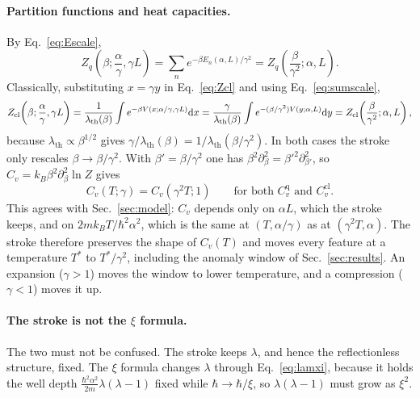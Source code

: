 \documentclass[11pt]{article}
\numberwithin{equation}{section}
\newcommand{\lth}{\lambda_{\mathrm{th}}}
\newcommand{\Cq}{C_v^{\mathrm{q}}}
\newcommand{\Ccl}{C_v^{\mathrm{cl}}}
\newcommand{\kB}{k_{B}}
\begin{document}
\paragraph{Partition functions and heat capacities.} By Eq.~\eqref{eq:Escale},
\[
Z_q\!\left(\beta;\frac\alpha\gamma,\gamma L\right)=\sum_ne^{-\beta E_n(\alpha,L)/\gamma^2}=Z_q\!\left(\frac{\beta}{\gamma^2};\alpha,L\right).
\]
Classically, substituting $x=\gamma y$ in Eq.~\eqref{eq:Zcl} and using Eq.~\eqref{eq:sumscale},
\[
Z_{\rm cl}\!\left(\beta;\frac\alpha\gamma,\gamma L\right)=\frac{1}{\lth(\beta)}\int e^{-\beta V(x;\alpha/\gamma,\gamma L)}\dd x=\frac{\gamma}{\lth(\beta)}\int e^{-(\beta/\gamma^2)V(y;\alpha,L)}\dd y=Z_{\rm cl}\!\left(\frac{\beta}{\gamma^2};\alpha,L\right),
\]
because $\lth\propto\beta^{1/2}$ gives $\gamma/\lth(\beta)=1/\lth(\beta/\gamma^2)$. In both cases the stroke only rescales $\beta\to\beta/\gamma^2$. With $\beta'=\beta/\gamma^2$ one has $\beta^2\partial_\beta^2=\beta'^2\partial_{\beta'}^2$, so $C_v=\kB\beta^2\partial_\beta^2\ln Z$ gives
\begin{equation}
C_v(T;\gamma)=C_v(\gamma^2T;1)\qquad\text{for both }\Cq\text{ and }\Ccl .
\label{eq:Cvscale}
\end{equation}
This agrees with Sec.~\ref{sec:model}: $C_v$ depends only on $\alpha L$, which the stroke keeps, and on $2m\kB T/\hbar^2\alpha^2$, which is the same at $(T,\alpha/\gamma)$ as at $(\gamma^2T,\alpha)$. The stroke therefore preserves the shape of $C_v(T)$ and moves every feature at a temperature $T^*$ to $T^*/\gamma^2$, including the anomaly window of Sec.~\ref{sec:results}. An expansion ($\gamma>1$) moves the window to lower temperature, and a compression ($\gamma<1$) moves it up.

\paragraph{The stroke is not the $\xi$ formula.} The two must not be confused. The stroke keeps $\lambda$, and hence the reflectionless structure, fixed. The $\xi$ formula changes $\lambda$ through Eq.~\eqref{eq:lamxi}, because it holds the well depth $\frac{\hbar^2\alpha^2}{2m}\lambda(\lambda-1)$ fixed while $\hbar\to\hbar/\xi$, so $\lambda(\lambda-1)$ must grow as $\xi^2$.

\end{document}

